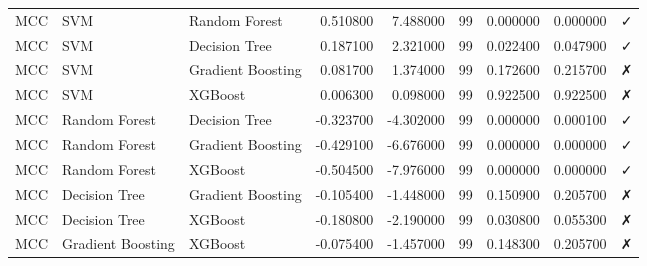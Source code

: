 \begin{table}
\begin{tabular}{lllrrrrrl}
MCC & SVM & Random Forest & 0.510800 & 7.488000 & 99 & 0.000000 & 0.000000 & ✓ \\
MCC & SVM & Decision Tree & 0.187100 & 2.321000 & 99 & 0.022400 & 0.047900 & ✓ \\
MCC & SVM & Gradient Boosting & 0.081700 & 1.374000 & 99 & 0.172600 & 0.215700 & ✗ \\
MCC & SVM & XGBoost & 0.006300 & 0.098000 & 99 & 0.922500 & 0.922500 & ✗ \\
MCC & Random Forest & Decision Tree & -0.323700 & -4.302000 & 99 & 0.000000 & 0.000100 & ✓ \\
MCC & Random Forest & Gradient Boosting & -0.429100 & -6.676000 & 99 & 0.000000 & 0.000000 & ✓ \\
MCC & Random Forest & XGBoost & -0.504500 & -7.976000 & 99 & 0.000000 & 0.000000 & ✓ \\
MCC & Decision Tree & Gradient Boosting & -0.105400 & -1.448000 & 99 & 0.150900 & 0.205700 & ✗ \\
MCC & Decision Tree & XGBoost & -0.180800 & -2.190000 & 99 & 0.030800 & 0.055300 & ✗ \\
MCC & Gradient Boosting & XGBoost & -0.075400 & -1.457000 & 99 & 0.148300 & 0.205700 & ✗ \\
\bottomrule
\end{tabular}
\end{table}
